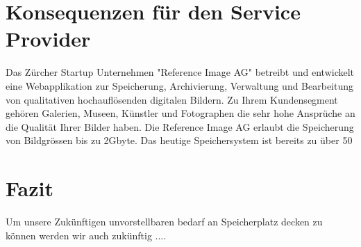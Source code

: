 \section{Konsequenzen für den Service Provider}
Das Zürcher Startup Unternehmen "Reference Image AG" betreibt und entwickelt eine Webapplikation zur Speicherung, Archivierung, Verwaltung und Bearbeitung von qualitativen hochauflösenden digitalen Bildern. Zu Ihrem Kundensegment gehören Galerien, Museen, Künstler und Fotographen die sehr hohe Ansprüche an die Qualität Ihrer Bilder haben. Die Reference Image AG erlaubt die Speicherung von Bildgrössen bis zu 2Gbyte. Das heutige Speichersystem ist bereits zu über 50%

\section{Fazit}
Um unsere Zukünftigen unvorstellbaren bedarf an Speicherplatz decken zu können werden wir auch zukünftig ....

